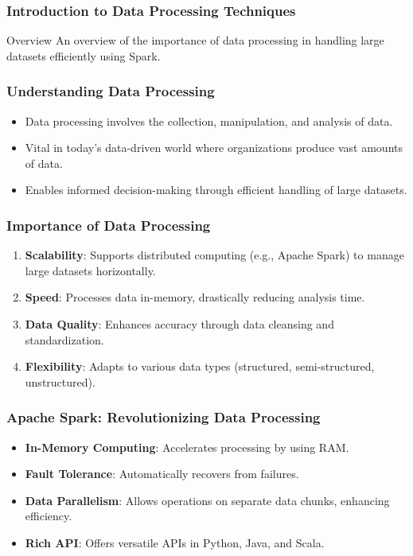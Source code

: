 \documentclass[aspectratio=169]{beamer}
\begin{document}
\frame{\titlepage}

\begin{frame}[fragile]
    \frametitle{Introduction to Data Processing Techniques}
    \begin{block}{Overview}
        An overview of the importance of data processing in handling large datasets efficiently using Spark.
    \end{block}
\end{frame}

\begin{frame}[fragile]
    \frametitle{Understanding Data Processing}
    \begin{itemize}
        \item Data processing involves the collection, manipulation, and analysis of data.
        \item Vital in today’s data-driven world where organizations produce vast amounts of data.
        \item Enables informed decision-making through efficient handling of large datasets.
    \end{itemize}
\end{frame}

\begin{frame}[fragile]
    \frametitle{Importance of Data Processing}
    \begin{enumerate}
        \item \textbf{Scalability}: Supports distributed computing (e.g., Apache Spark) to manage large datasets horizontally.
        \item \textbf{Speed}: Processes data in-memory, drastically reducing analysis time.
        \item \textbf{Data Quality}: Enhances accuracy through data cleansing and standardization.
        \item \textbf{Flexibility}: Adapts to various data types (structured, semi-structured, unstructured).
    \end{enumerate}
\end{frame}

\begin{frame}[fragile]
    \frametitle{Apache Spark: Revolutionizing Data Processing}
    \begin{itemize}
        \item \textbf{In-Memory Computing}: Accelerates processing by using RAM.
        \item \textbf{Fault Tolerance}: Automatically recovers from failures.
        \item \textbf{Data Parallelism}: Allows operations on separate data chunks, enhancing efficiency.
        \item \textbf{Rich API}: Offers versatile APIs in Python, Java, and Scala.
    \end{itemize}
\end{frame}
\end{document}

